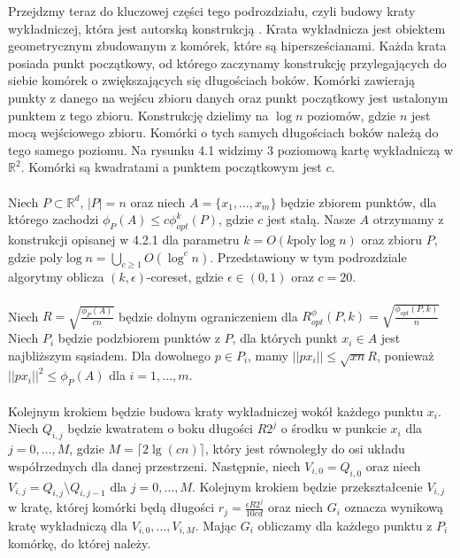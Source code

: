 Przejdzmy teraz do kluczowej części tego podrozdziału, czyli budowy kraty wykładniczej, która jest autorską konstrukcją \cite{10.1145/1007352.1007400}.
Krata wykładnicza jest obiektem geometrycznym zbudowanym z komórek, które są hipersześcianami.
Każda krata posiada punkt początkowy, od którego zaczynamy konstrukcję przylegających do siebie komórek o zwiększających się długościach boków.
Komórki zawierają punkty z danego na wejścu zbioru danych oraz punkt początkowy jest ustalonym punktem z tego zbioru.
Konstrukcję dzielimy na $\log n$ poziomów, gdzie $n$ jest mocą wejściowego zbioru.
Komórki o tych samych długościach boków należą do tego samego poziomu.
Na rysunku 4.1 widzimy 3 poziomową kartę wykładniczą w $\mathbb{R}^2$.
Komórki są kwadratami a punktem początkowym jest $c$.
\\~\\
Niech $P \subset \mathbb{R}^d$, $|P| = n$ oraz niech $A = \{x_{1}, \dots, x_{m}\}$ będzie zbiorem punktów, dla którego zachodzi $\phi_{P}(A) \leq c\phi_{opt}^{k}(P)$, gdzie $c$ jest stałą.
Nasze $A$ otrzymamy z konstrukcji opisanej w 4.2.1 dla parametru $k = O(k \text{poly} \log n)$ oraz zbioru $P$, gdzie $\text{poly} \log n = \bigcup_{c \geq 1} O(\log^{c}n)$.
Przedstawiony w tym podrozdziale algorytmy oblicza $(k, \epsilon)$-coreset, gdzie $\epsilon \in (0,1)$ oraz $c = 20$.
\\~\\
Niech $R = \sqrt{\frac{\phi_{P}(A)}{cn}}$ będzie dolnym ograniczeniem dla $R_{opt}^{\phi}(P, k) = \sqrt{\frac{\phi_{opt}(P, k)}{n}}$
Niech $P_{i}$ będzie podzbiorem punktów z $P$, dla których punkt $x_{i} \in A$ jest najbliższym sąsiadem. 
Dla dowolnego $p \in P_{i}$, mamy $||px_{i}|| \leq \sqrt{xn}R$, ponieważ $||px_{i}||^{2} \leq \phi_{P}(A)$ dla $i = 1, \dots, m$.
\\~\\
Kolejnym krokiem będzie budowa kraty wykładniczej wokół każdego punktu $x_{i}$.
Niech $Q_{i,j}$ będzie kwatratem o boku długości $R2^{j}$ o środku w punkcie $x_{i}$ dla $j = 0, \dots, M$, gdzie $M = \lceil 2 \lg(cn) \rceil$, który jest równoległy do osi układu współrzednych dla danej przestrzeni.
Następnie, niech $V_{i, 0} = Q_{i, 0}$ oraz niech $V_{i,j} = Q_{i,j} \setminus Q_{i,j-1}$ dla $j = 0, \dots, M$.
Kolejnym krokiem będzie przekształcenie $V_{i,j}$ w kratę, której komórki będą długości $r_{j} = \frac{\epsilon R2^{j}}{10cd}$ oraz niech $G_{i}$ oznacza wynikową kratę wykładniczą dla $V_{i,0}, \dots, V_{i,M}$.
Mając $G_{i}$ obliczamy dla każdego punktu z $P_{i}$ komórkę, do której należy.
